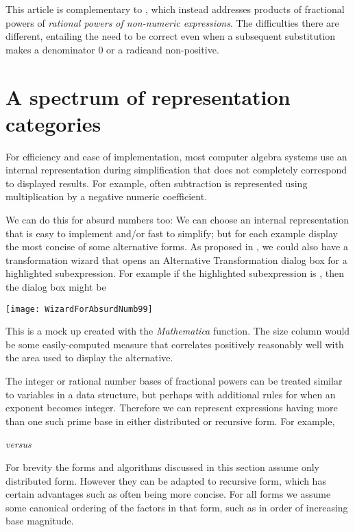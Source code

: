 \documentclass[12pt,english]{article}
\theoremstyle{definition}
\theoremstyle{remark}
\theoremstyle{plain}
\theoremstyle{plain}
\begin{document}
This article is complementary to \cite{StoutemyerProductsOfPowers},
which instead addresses products of fractional powers of \textsl{rational
powers of non-numeric expressions}. The difficulties there are different,
entailing the need to be correct even when a subsequent substitution
makes a denominator 0 or a radicand non-positive.


\section{A spectrum of representation categories\label{sec:AlternativeForms-1}}

For efficiency and ease of implementation, most computer algebra systems
use an internal representation during simplification that does not
completely correspond to displayed results. For example, often subtraction
is represented using multiplication by a negative numeric coefficient.

We can do this for absurd numbers too: We can choose an internal representation
that is easy to implement and/or fast to simplify; but for each example
display the most concise of some alternative forms. As proposed in
\cite{StoutemyerInterface,UsefulNumbers}, we could also have a transformation
wizard that opens an Alternative Transformation dialog box for a highlighted
subexpression. For example if the highlighted subexpression is ,
then the dialog box might be

\noindent \begin{center}
\texttt{[image: WizardForAbsurdNumb99]}
\par\end{center}

\noindent This is a mock up created with the \textsl{Mathematica}
 function. The size column would be
some easily-computed measure that correlates positively reasonably
well with the area used to display the alternative.

The integer or rational number bases of fractional powers can be treated
similar to variables in a data structure, but perhaps with additional
rules for when an exponent becomes integer. Therefore we can represent
expressions having more than one such prime base in either distributed
or recursive form. For example,

\emph{versus\vspace{-0.7em}
}


For brevity the forms and algorithms discussed in this section assume
only distributed form. However they can be adapted to recursive form,
which has certain advantages such as often being more concise. For
all forms we assume some canonical ordering of the factors in that
form, such as in order of increasing base magnitude.
\end{document}
